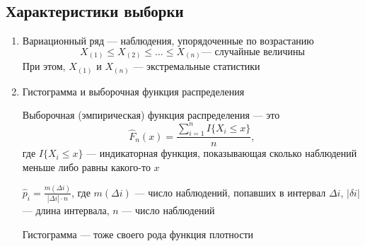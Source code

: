 \documentclass[a4paper, 10pt]{article}
\begin{document}
\subsection{Характеристики выборки}
\begin{enumerate}
    \item Вариационный ряд — наблюдения, упорядоченные по возрастанию
    \begin{equation*}
        X_{(1)}\leqslant X_{(2)}\leqslant\ldots\leqslant X_{(n)}\text{— случайные величины}
    \end{equation*}
    При этом, $X_{(1)}$ и $X_{(n)}$ — экстремальные статистики

    \item Гистограмма и выборочная функция распределения
    
     Выборочная (эмпирическая) функция распределения — это $$\hat{F}_n(x)=\displaystyle\frac{\sum_{i=1}^{n}I\{X_i\leqslant x\}}{n},$$ где $I\{X_i\leqslant x\}$ — индикаторная функция, показывающая сколько наблюдений меньше либо равны какого-то $x$

     $\hat{p}_i=\displaystyle\frac{m(\Delta i)}{|\Delta i|\cdot n}$, где $m(\Delta i)$ — число наблюдений, попавших в интервал $\Delta i$, $|\delta i|$ — длина интервала, $n$ — число наблюдений

    Гистограмма — тоже своего рода функция плотности
\end{enumerate}
\end{document}
